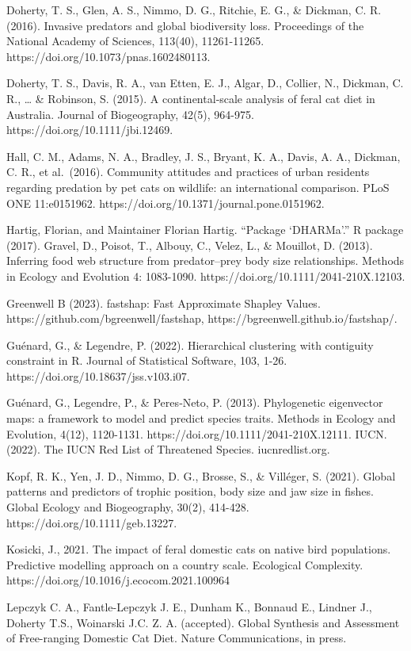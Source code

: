 \documentclass[
  super,
  review,
  3p]{elsarticle}
\begin{document}
Doherty, T. S., Glen, A. S., Nimmo, D. G., Ritchie, E. G., \& Dickman,
C. R. (2016). Invasive predators and global biodiversity loss.
Proceedings of the National Academy of Sciences, 113(40), 11261-11265.
https://doi.org/10.1073/pnas.1602480113.

Doherty, T. S., Davis, R. A., van Etten, E. J., Algar, D., Collier, N.,
Dickman, C. R., \ldots{} \& Robinson, S. (2015). A continental‐scale
analysis of feral cat diet in Australia. Journal of Biogeography, 42(5),
964-975. https://doi.org/10.1111/jbi.12469.

Hall, C. M., Adams, N. A., Bradley, J. S., Bryant, K. A., Davis, A. A.,
Dickman, C. R., et al.~(2016). Community attitudes and practices of
urban residents regarding predation by pet cats on wildlife: an
international comparison. PLoS ONE 11:e0151962.
https://doi.org/10.1371/journal.pone.0151962.

Hartig, Florian, and Maintainer Florian Hartig. ``Package `DHARMa'.'' R
package (2017). Gravel, D., Poisot, T., Albouy, C., Velez, L., \&
Mouillot, D. (2013). Inferring food web structure from predator--prey
body size relationships. Methods in Ecology and Evolution 4: 1083-1090.
https://doi.org/10.1111/2041-210X.12103.

Greenwell B (2023). fastshap: Fast Approximate Shapley Values.
https://github.com/bgreenwell/fastshap,
https://bgreenwell.github.io/fastshap/.

Guénard, G., \& Legendre, P. (2022). Hierarchical clustering with
contiguity constraint in R. Journal of Statistical Software, 103, 1-26.
https://doi.org/10.18637/jss.v103.i07.

Guénard, G., Legendre, P., \& Peres‐Neto, P. (2013). Phylogenetic
eigenvector maps: a framework to model and predict species traits.
Methods in Ecology and Evolution, 4(12), 1120-1131.
https://doi.org/10.1111/2041-210X.12111. IUCN. (2022). The IUCN Red List
of Threatened Species. iucnredlist.org.

Kopf, R. K., Yen, J. D., Nimmo, D. G., Brosse, S., \& Villéger, S.
(2021). Global patterns and predictors of trophic position, body size
and jaw size in fishes. Global Ecology and Biogeography, 30(2), 414-428.
https://doi.org/10.1111/geb.13227.

Kosicki, J., 2021. The impact of feral domestic cats on native bird
populations. Predictive modelling approach on a country scale.
Ecological Complexity. https://doi.org/10.1016/j.ecocom.2021.100964

Lepczyk C. A., Fantle-Lepczyk J. E., Dunham K., Bonnaud E., Lindner J.,
Doherty T.S., Woinarski J.C. Z. A. (accepted). Global Synthesis and
Assessment of Free-ranging Domestic Cat Diet. Nature Communications, in
press.
\end{document}
